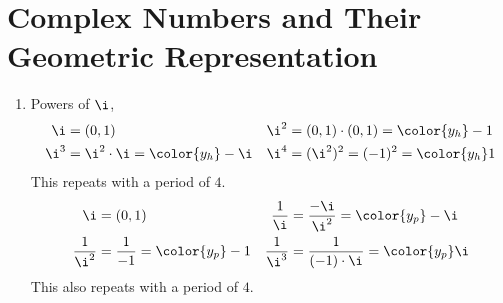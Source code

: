 \section{Complex Numbers and Their Geometric Representation}

\begin{enumerate}
    \item Powers of $ \i $,
          \begin{align}
              \i   & = (0, 1)                               &
              \i^2 & = (0, 1) \cdot (0, 1) = \color{y_h} -1   \\
              \i^3 & = \i^2 \cdot \i = \color{y_h} -\i      &
              \i^4 & = (\i^2)^2 = (-1)^2 = \color{y_h} 1
          \end{align}
          This repeats with a period of $ 4 $.
          \begin{align}
              \i             & = (0, 1)                                   &
              \frac{1}{\i}   & = \frac{-\i}{\i^2} = \color{y_p} -\i         \\
              \frac{1}{\i^2} & = \frac{1}{-1} = \color{y_p} -1            &
              \frac{1}{\i^3} & = \frac{1}{(-1) \cdot \i} = \color{y_p} \i
          \end{align}
          This also repeats with a period of $ 4 $.


\end{enumerate}
